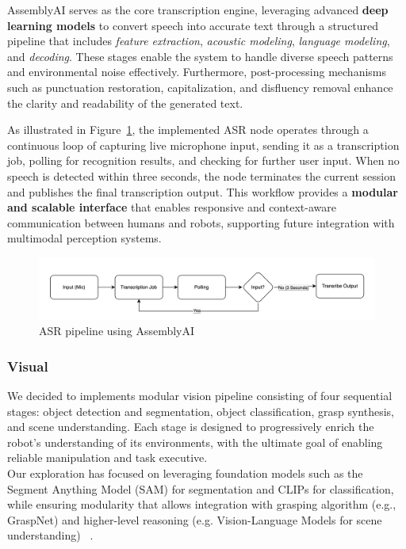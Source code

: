 \documentclass[12pt]{extarticle}
\begin{document}
AssemblyAI serves as the core transcription engine, leveraging advanced \textbf{deep learning models} to convert speech into accurate text through a structured pipeline that includes \textit{feature extraction}, \textit{acoustic modeling}, \textit{language modeling}, and \textit{decoding}. These stages enable the system to handle diverse speech patterns and environmental noise effectively. Furthermore, post-processing mechanisms such as punctuation restoration, capitalization, and disfluency removal enhance the clarity and readability of the generated text.

As illustrated in Figure~\ref{fig: ASR_Pipeline.png}, the implemented ASR node operates through a continuous loop of capturing live microphone input, sending it as a transcription job, polling for recognition results, and checking for further user input. When no speech is detected within three seconds, the node terminates the current session and publishes the final transcription output. This workflow provides a \textbf{modular and scalable interface} that enables responsive and context-aware communication between humans and robots, supporting future integration with multimodal perception systems.

\begin{figure}[H]
    \centering
    \includegraphics[width=\linewidth]{images/ASR_Pipeline.png}
    \caption{ASR pipeline using AssemblyAI}
    \label{fig: ASR_Pipeline.png}
\end{figure}

\subsubsection{Visual}
We decided to implements modular vision pipeline consisting of four sequential stages: object detection and segmentation, object classification, grasp synthesis, and scene understanding. Each stage is designed to progressively enrich the robot's understanding of its environments, with the ultimate goal of enabling reliable manipulation and task executive. \\

Our exploration has focused on leveraging foundation models such as the Segment Anything Model (SAM) for segmentation and CLIPs for classification, while ensuring modularity that allows integration with grasping algorithm (e.g., GraspNet) and higher-level reasoning (e.g. Vision-Language Models for scene understanding) ~\cite{segment-anything-2023,tlac-2025,hanwen2024_grasp,scene_seg}. \\
\end{document}
